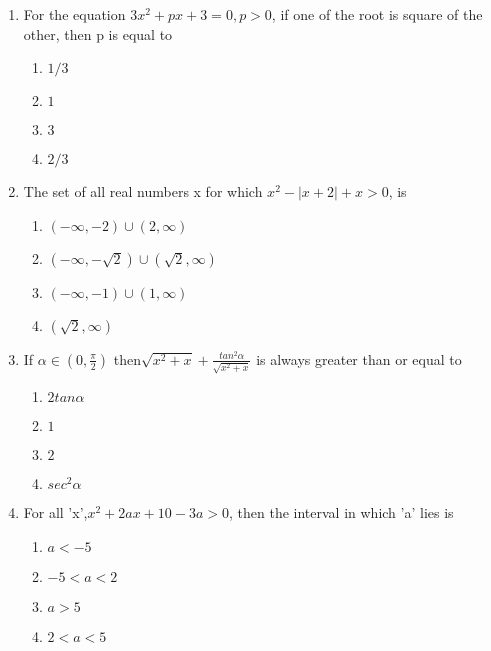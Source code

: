 \begin{enumerate}[label=\arabic*.,ref=\thesubsection.\theenumi]
\item For the equation $3x^{2}+px+3=0, p>0$, if one of the root is square of the other, then p is equal to
\begin{enumerate}
\item $1/3$
\item $1$ 
\item $3$
\item $2/3$
\end{enumerate}


\item The set of all real numbers x for which $x^{2}-|x+2|+x>0$, is
\begin{enumerate}
\item $(-\infty,-2)\cup(2,\infty)$
\item $(-\infty,-\sqrt2)\cup(\sqrt2,\infty)$ 
\item $(-\infty,-1)\cup(1,\infty)$
\item $(\sqrt2,\infty)$ 
\end{enumerate}

\item If $\alpha \in(0,\frac{\pi}{2})$ then$\sqrt{x^{2}+x}+\frac{tan^{2}\alpha}{\sqrt{x^{2}+x}}$ is always greater than or equal to 
\begin{enumerate}
\item $2tan\alpha$
\item $1$ 
\item $2$
\item $sec^{2}\alpha$ 
\end{enumerate}

\item For all 'x',$x^{2}+2ax+10-3a>0$, then the interval in which 'a' lies is 
\begin{enumerate}
\item $a<-5$
\item $-5<a<2$ 
\item $a>5$
\item $2<a<5$
\end{enumerate}


\end{enumerate}
